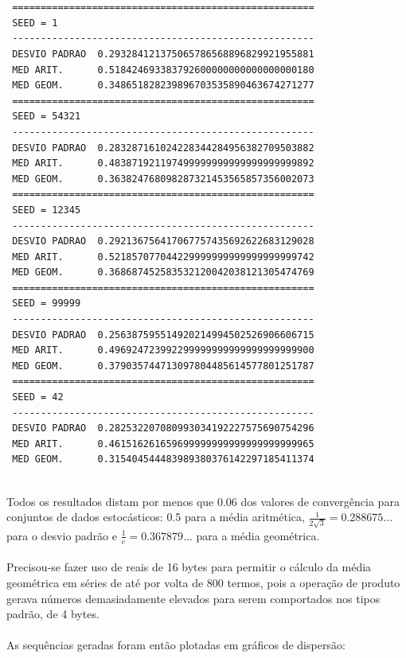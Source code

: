 \documentclass{article}
\begin{document}
\begin{lstlisting}


 =====================================================
 SEED = 1
 -----------------------------------------------------
 DESVIO PADRAO  0.293284121375065786568896829921955881      
 MED ARIT.      0.518424693383792600000000000000000180      
 MED GEOM.      0.348651828239896703535890463674271277      
 =====================================================
 SEED = 54321
 -----------------------------------------------------
 DESVIO PADRAO  0.283287161024228344284956382709503882      
 MED ARIT.      0.483871921197499999999999999999999892      
 MED GEOM.      0.363824768098287321453565857356002073      
 =====================================================
 SEED = 12345
 -----------------------------------------------------
 DESVIO PADRAO  0.292136756417067757435692622683129028      
 MED ARIT.      0.521857077044229999999999999999999742      
 MED GEOM.      0.368687452583532120042038121305474769      
 =====================================================
 SEED = 99999
 -----------------------------------------------------
 DESVIO PADRAO  0.256387595514920214994502526906606715      
 MED ARIT.      0.496924723992299999999999999999999900      
 MED GEOM.      0.379035744713097804485614577801251787      
 =====================================================
 SEED = 42
 -----------------------------------------------------
 DESVIO PADRAO  0.282532207080993034192227575690754296      
 MED ARIT.      0.461516261659699999999999999999999965      
 MED GEOM.      0.315404544483989380376142297185411374 


\end{lstlisting}
Todos os resultados distam por menos que 0.06 dos valores de convergência para conjuntos de dados estocásticos: 0.5 para a média aritmética, \(\frac{1}{2\sqrt{3}} = 0.288675...\) para o desvio padrão e \(\frac{1}{e}=0.367879...\) para a média geométrica.\paragraph{}
Precisou-se fazer uso de reais de 16 bytes para permitir o cálculo da média geométrica em séries de até por volta de 800 termos, pois a operação de produto gerava números demasiadamente elevados para serem comportados nos tipos padrão, de 4 bytes.\paragraph{}
As sequências geradas foram então plotadas em gráficos de dispersão:
\end{document}
